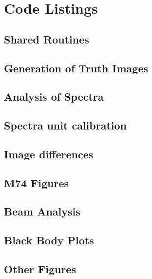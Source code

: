 

\providecommand{\pycodesection}[3]{
\subsection{#1}
\pycode{#2}{#3}
}

\providecommand{\pycode}[2]{
  
}

\providecommand{\configfile}[1]{
  
}

\section{Code Listings}
\pycodesection{Shared Routines}{code/common.py}{common.py}
\pycodesection{Generation of Truth Images}{code/spitzer.py}{spitzer.py}
\pycodesection{Analysis of Spectra}{code/spectra_resolution.py}{spectra\_resolution.py}
\pycodesection{Spectra unit calibration}{code/make_gauss.py}{make\_gauss.py}
\pycode{code/fft_calibration.py}{fft\_calibration.py}
\pycode{code/fft_calibration_run.py}{fft\_calibration\_run.py}
\pycodesection{Image differences}{code/differences.py}{differences.py}
\pycodesection{M74 Figures}{code/plot_m74.py}{plot\_m74.py}
\pycodesection{Beam Analysis}{code/beam_analysis.py}{beam\_analysis.py}
\pycodesection{Black Body Plots}{bbfig.py}{bbfig.py}
\break
\pycodesection{Other Figures}{code/other_plots.py}{other\_plots.py}
